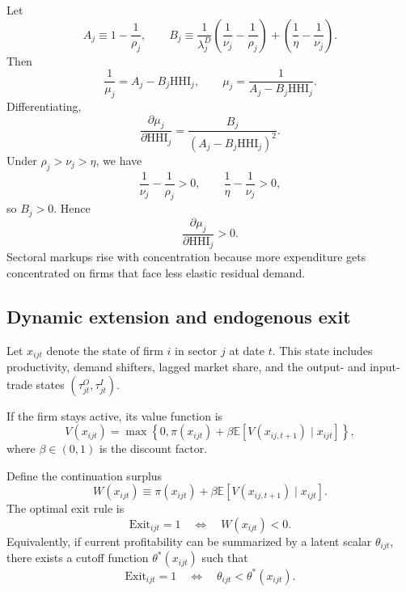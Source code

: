 Let
\[
A_j \equiv 1 - \frac{1}{\rho_j},
\qquad
B_j \equiv
\frac{1}{\lambda_j^D}
\left( \frac{1}{\nu_j} - \frac{1}{\rho_j} \right)
+
\left( \frac{1}{\eta} - \frac{1}{\nu_j} \right).
\]
Then
\[
\frac{1}{\mu_j} = A_j - B_j \text{HHI}_j,
\qquad
\mu_j = \frac{1}{A_j - B_j \text{HHI}_j}.
\]
Differentiating,
\[
\frac{\partial \mu_j}{\partial \text{HHI}_j}
=
\frac{B_j}{(A_j - B_j \text{HHI}_j)^2}.
\]
Under $\rho_j > \nu_j > \eta$, we have
\[
\frac{1}{\nu_j} - \frac{1}{\rho_j} > 0,
\qquad
\frac{1}{\eta} - \frac{1}{\nu_j} > 0,
\]
so $B_j > 0$. Hence
\begin{equation}
\frac{\partial \mu_j}{\partial \text{HHI}_j} > 0.
\label{eq:app_markup_concentration_positive}
\end{equation}
Sectoral markups rise with concentration because more expenditure gets concentrated on firms that face less elastic residual demand.

\subsection{Dynamic extension and endogenous exit}

Let $x_{ijt}$ denote the state of firm $i$ in sector $j$ at date $t$. This state includes productivity, demand shifters, lagged market share, and the output- and input-trade states $(\tau_{jt}^O,\tau_{jt}^I)$.

If the firm stays active, its value function is
\begin{equation}
V(x_{ijt})
=
\max
\left\{
0,
\pi(x_{ijt})
+ \beta \mathbb{E}\left[ V(x_{ij,t+1}) \mid x_{ijt} \right]
\right\},
\label{eq:app_bellman}
\end{equation}
where $\beta \in (0,1)$ is the discount factor.

Define the continuation surplus
\[
W(x_{ijt})
\equiv
\pi(x_{ijt})
+ \beta \mathbb{E}\left[ V(x_{ij,t+1}) \mid x_{ijt} \right].
\]
The optimal exit rule is
\begin{equation}
\text{Exit}_{ijt} = 1
\quad \Longleftrightarrow \quad
W(x_{ijt}) < 0.
\label{eq:app_exit_rule}
\end{equation}
Equivalently, if current profitability can be summarized by a latent scalar $\theta_{ijt}$, there exists a cutoff function $\theta^*(x_{ijt})$ such that
\begin{equation}
\text{Exit}_{ijt} = 1
\quad \Longleftrightarrow \quad
\theta_{ijt} < \theta^*(x_{ijt}).
\label{eq:app_exit_threshold}
\end{equation}

